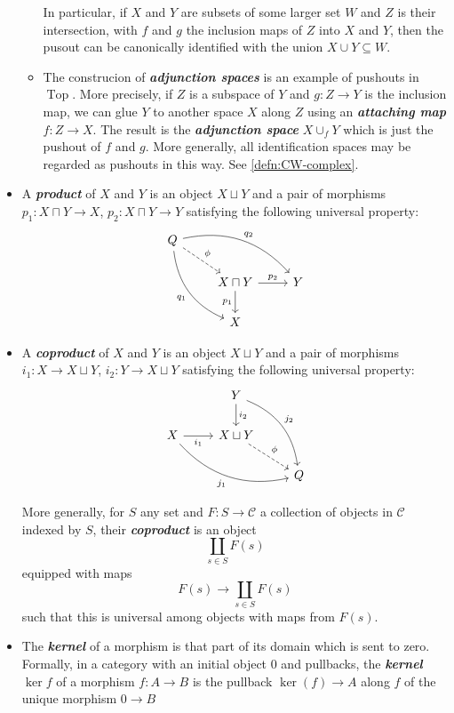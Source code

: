 \documentclass{article}
\newcommand{\Cc}{\mathcal{C}}
\DeclareMathOperator{\Top}{Top}
\begin{document}
\begin{defn}
\begin{itemize}
\begin{example}
\begin{itemize}
			In particular, if $X$ and $Y$ are subsets of some larger set $W$ and $Z$ is their intersection, with $f$ and $g$ the inclusion maps of $Z$ into $X$ and $Y$, then the pusout can be canonically identified with the union $X\cup Y\subseteq W$.
			\item \label{adjunction-space}The construcion of \textbf{\textit{adjunction spaces}} is an example of pushouts in $\Top$. More precisely, if $Z$ is a subspace of $Y$ and $g:Z\to Y$ is the inclusion map, we can glue $Y$ to another space $X$ along $Z$ using an \textbf{\textit{attaching map}} $f:Z\to X$. The result is the \textbf{\textit{adjunction space}} $X\cup_f Y$ which is just the pushout of $f$ and $g$. More generally, all identification spaces may be regarded as pushouts in this way. See \cref{defn:CW-complex}.
			\end{itemize}
		\end{example}
		\item A \textbf{\textit{product}} of $X$ and $Y$ is an object $X\sqcup Y$ and a pair of morphisms $p_1:X\sqcap Y\to X$, $p_2:X\sqcap Y\to Y$ satisfying the following universal property:
		\[\begin{tikzcd}
			Q\arrow[rrd,bend left,"q_2"]\arrow[ddr,"q_1",swap,bend right]\arrow[dr,dashed,"\phi"]\\
			&X\sqcap Y\arrow[r,"p_2"]\arrow[d,"p_1",swap]&Y\\
			&X
		\end{tikzcd}\]
		\item A \textbf{\textit{coproduct}} of $X$ and $Y$ is an object $X\sqcup Y$ and a pair of morphisms $i_1:X\to X\sqcup Y$, $i_2:Y\to X\sqcup Y$ satisfying the following universal property:
		\[\begin{tikzcd}
			&Y\arrow[d,"i_2"]\arrow[ddr,bend left,"j_2"]\\
			X\arrow[r,"i_1",swap]\arrow[drr,bend right,swap,"j_1"]&X\sqcup Y\arrow[dr,dashed,"\phi"]\\
			&&Q
		\end{tikzcd}\]
		\begin{remark}
			More generally, for $S$ any set and $F:S\to\Cc$ a collection of objects in $\Cc$ indexed by $S$, their \textbf{\textit{coproduct}} is an object
			\[\coprod_{s\in S}F(s)\]
			equipped with maps
			\[F(s)\to\coprod_{s\in S}F(s)\]
			such that this is universal among objects with maps from $F(s)$.
		\end{remark}
		\item The \textbf{\textit{kernel}} of a morphism is that part of its domain which is sent to zero. Formally, in a category with an initial object 0 and pullbacks, the \textbf{\textit{kernel $\ker f$}} of a morphism $f:A\to B$ is the pullback $\ker(f)\to A$ along $f$ of the unique morphism $0\to B$
		

\end{itemize}
\end{defn}
\end{document}

